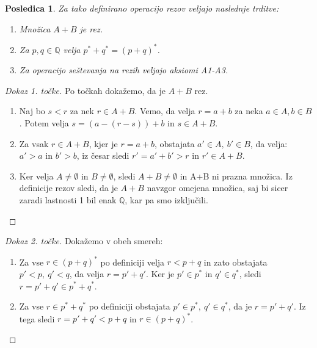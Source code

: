 \documentclass[10pt, a4paper]{article}
\newtheorem{posledica}[izr]{Posledica}
\newenvironment{noticeC}{%
  \tcolorbox[%
  notitle,
  empty,
  enhanced,  %
  breakable,
  coltext=black, 
  fontupper=\rmfamily,
  parbox=false,
  noparskip,
  sharp corners,
  boxrule=-1pt,  %
  frame hidden,
  left=7pt,  %
  right=7pt,
  top=5pt,
  bottom=5pt,
  before skip=2.5ex plus 2pt,
  after skip=2.5ex plus 2pt,
  overlay unbroken and last={%
  },
  ]}
{\endtcolorbox}
\newcommand{\Q}{\mathbb {Q}}
\begin{document}
\begin{posledica}
    Za tako definirano operacijo rezov veljajo naslednje trditve:
    \begin{enumerate}
        \item Množica $A+B$ je rez.
        \item Za $p,q \in \Q$ velja $p^{*} + q^{*} = (p+q)^{*}$. 
        \item Za operacijo seštevanja na rezih veljajo aksiomi A1-A3.
    \end{enumerate}
\end{posledica}

\begin{noticeC}
    \begin{proof}[Dokaz 1. točke]
        Po točkah dokažemo, da je $A+B$ rez.
        \begin{enumerate}
            \item Naj bo $s<r$ za nek $r \in A+B$. Vemo, da velja $r = a+b$ za neka $a \in A, b \in B$. Potem velja $s = (a - (r-s)) + b$ in $s \in A + B$.
            \item Za vsak $r \in A+B$, kjer je $r = a + b$, obstajata $a' \in A,\ b' \in B$, da velja: $a' > a$ in $b' > b$, iz česar sledi $r' = a' + b' > r$ in $r' \in A + B$.
            \item Ker velja $A \neq \emptyset$ in $B \neq \emptyset$, sledi $A+B \neq \emptyset$ in A+B ni prazna množica. Iz definicije rezov sledi, da je $A+B$ navzgor omejena množica, saj bi sicer zaradi lastnosti 1 bil enak $\Q$, kar pa smo izključili. \qedhere
        \end{enumerate}
    \end{proof}
\end{noticeC}

\begin{noticeC}
    \begin{proof}[Dokaz 2. točke]
        Dokažemo v obeh smereh:
        \begin{enumerate}
            \item Za vse $r \in (p+q)^{*}$ po definiciji velja $r < p+q$ in zato obstajata $p'< p,\ q'< q$, da velja $r = p' + q'$. Ker je $p' \in p^{*}$ in $q' \in q^{*}$, sledi $r = p' + q' \in p^{*}+q^{*}$.
            \item Za vse $r \in p^{*} + q^{*}$ po definiciji obstajata $p' \in p^{*},\ q' \in q^{*}$, da je $r = p' + q'$. Iz tega sledi $r = p' + q' < p + q$ in $r \in (p + q)^{*}$. \qedhere
        \end{enumerate}
    \end{proof}
\end{noticeC}
\end{document}
